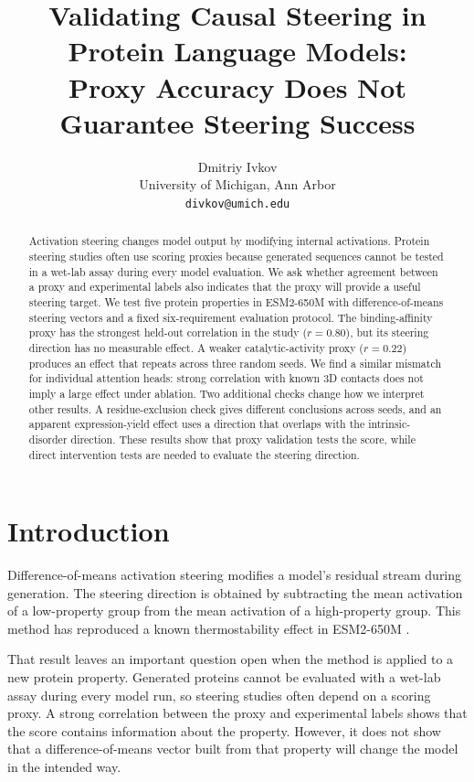 \documentclass{article}
\title{Validating Causal Steering in Protein Language Models: \\
Proxy Accuracy Does Not Guarantee Steering Success}
\author{Dmitriy Ivkov \\
University of Michigan, Ann Arbor \\
\texttt{divkov@umich.edu}}
\date{}
\begin{document}
\maketitle

\begin{abstract}
Activation steering changes model output by modifying internal
activations. Protein steering studies often use scoring proxies because
generated sequences cannot be tested in a wet-lab assay during every
model evaluation. We ask whether agreement between a proxy and
experimental labels also indicates that the proxy will provide a useful
steering target. We test five protein properties in ESM2-650M with
difference-of-means steering vectors and a fixed six-requirement
evaluation protocol. The binding-affinity proxy has the strongest
held-out correlation in the study ($r=0.80$), but its steering direction
has no measurable effect. A weaker catalytic-activity proxy ($r=0.22$)
produces an effect that repeats across three random seeds. We find a
similar mismatch for individual attention heads: strong correlation
with known 3D contacts does not imply a large effect under ablation. Two
additional checks change how we interpret other results. A
residue-exclusion check gives different conclusions across seeds, and an
apparent expression-yield effect uses a direction that overlaps with the
intrinsic-disorder direction. These results show that proxy validation
tests the score, while direct intervention tests are needed to evaluate
the steering direction.
\end{abstract}

\section{Introduction}

Difference-of-means activation steering modifies a model's residual
stream during generation. The steering direction is obtained by
subtracting the mean activation of a low-property group from the mean
activation of a high-property group. This method has reproduced a known
thermostability effect in ESM2-650M \citep{huang2025steering}.

That result leaves an important question open when the method is applied
to a new protein property. Generated proteins cannot be evaluated with a
wet-lab assay during every model run, so steering studies often depend
on a scoring proxy. A strong correlation between the proxy and
experimental labels shows that the score contains information about the
property. However, it does not show that a difference-of-means vector
built from that property will change the model in the intended way.
\end{document}
